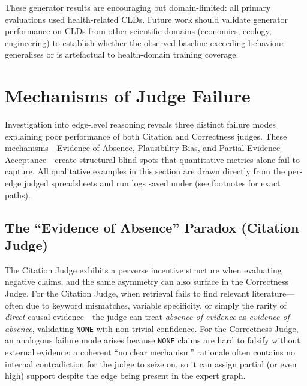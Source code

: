 These generator results are encouraging but domain-limited: all primary evaluations used health-related CLDs. Future work should validate generator performance on CLDs from other scientific domains (economics, ecology, engineering) to establish whether the observed baseline-exceeding behaviour generalises or is artefactual to health-domain training coverage.

\section{Mechanisms of Judge Failure}
\label{sec:discussion_failure_mechanisms}

Investigation into edge-level reasoning reveals three distinct failure modes explaining poor performance of both Citation and Correctness judges. These mechanisms---Evidence of Absence, Plausibility Bias, and Partial Evidence Acceptance---create structural blind spots that quantitative metrics alone fail to capture.
All qualitative examples in this section are drawn directly from the per-edge judged spreadsheets and run logs saved under \texttt{} (see footnotes for exact paths).

\subsection{The ``Evidence of Absence'' Paradox (Citation Judge)}

The Citation Judge exhibits a perverse incentive structure when evaluating negative claims, and the same asymmetry can also surface in the Correctness Judge. For the Citation Judge, when retrieval fails to find relevant literature---often due to keyword mismatches, variable specificity, or simply the rarity of \textit{direct} causal evidence---the judge can treat \textit{absence of evidence} as \textit{evidence of absence}, validating \texttt{NONE} with non-trivial confidence. For the Correctness Judge, an analogous failure mode arises because \texttt{NONE} claims are hard to falsify without external evidence: a coherent ``no clear mechanism'' rationale often contains no internal contradiction for the judge to seize on, so it can assign partial (or even high) support despite the edge being present in the expert graph.

